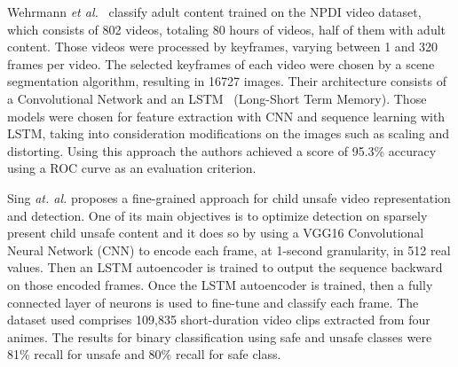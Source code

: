 Wehrmann \textit{et al.}~\cite{wehrmann2018adult} classify adult content trained on the NPDI video dataset, which consists of 802 videos, totaling 80 hours of videos, half of them with adult content.
Those videos were processed by keyframes, varying between 1 and 320 frames per video.
The selected keyframes of each video were chosen by a scene segmentation algorithm, resulting in 16727 images.
Their architecture consists of a Convolutional Network and an LSTM~\cite{hochreiter1997long} (Long-Short Term Memory).
Those models were chosen for feature extraction with CNN and sequence learning with LSTM, taking into consideration modifications on the images such as scaling and distorting.
Using this approach the authors achieved a score of 95.3\% accuracy using a ROC curve as an evaluation criterion.

Sing \textit{at. al.}\cite{singh2019kidsguard} proposes a fine-grained approach for child unsafe video representation and detection. One of its main objectives is to optimize detection on sparsely present child unsafe content and it does so by using a VGG16\cite{vgg} Convolutional Neural Network (CNN) to encode each frame, at 1-second granularity, in 512 real values. 
Then an LSTM autoencoder is trained to output the sequence backward on those encoded frames. 
Once the LSTM autoencoder is trained, then a fully connected layer of neurons is used to fine-tune and classify each frame. 
The dataset used comprises 109,835 short-duration video clips extracted from four animes. 
The results for binary classification using safe and unsafe classes were 81\% recall for unsafe and 80\% recall for safe class.


